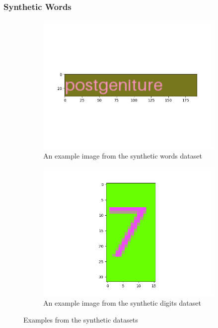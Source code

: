 \subsubsection{Synthetic Words}
\begin{figure}
    \begin{subfigure}{0.5\textwidth}
        \includegraphics[width=\textwidth]{figures/synthetic_words_example.png}
        \caption{An example image from the synthetic words dataset}
        \label{syntheticwordsexample}
    \end{subfigure}\begin{subfigure}{0.5\textwidth}
        \includegraphics[width=\textwidth]{figures/synthetic_digits_example.png}
        \caption{An example image from the synthetic digits dataset}
        \label{syntheticdigitsexample}
    \end{subfigure}
    \caption{Examples from the synthetic datasets}
    \label{syntheticexamples}
\end{figure}
